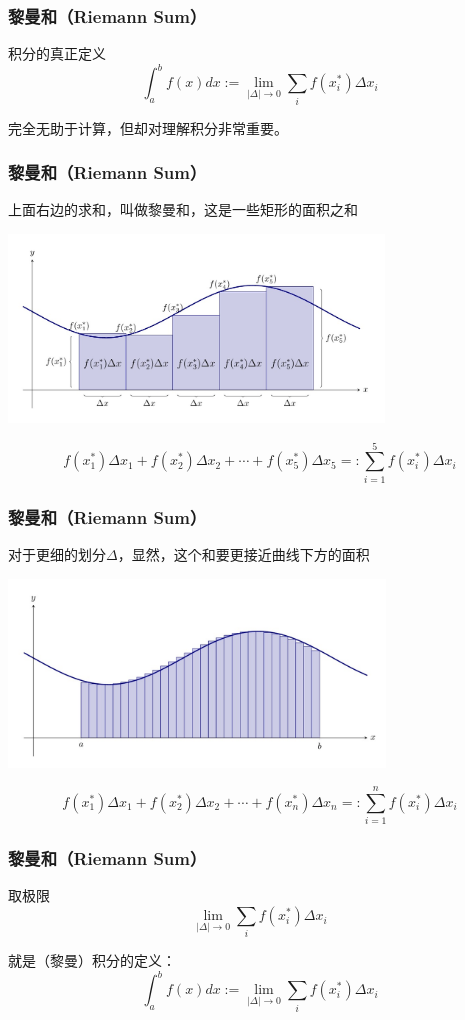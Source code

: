 \documentclass[CJK]{beamer}
\begin{document}
\begin{frame}
\frametitle{黎曼和（Riemann Sum）}
积分的真正定义
\[
	\int_a^b f(x)dx := \lim_{|\Delta|\to 0}\sum_i f(x_i^*)\Delta x_i
\]

完全\alert{无助于}计算，但却对\alert{理解}积分非常重要。
\end{frame}

\begin{frame}
\frametitle{黎曼和（Riemann Sum）}
上面右边的求和，叫做\alert{黎曼和}，这是一些矩形的面积之和
\begin{center}
\includegraphics[height=5cm]{graph9.jpeg}
\end{center}
\[
f(x_1^*)\Delta x_1 + f(x_2^*)\Delta x_2 + \cdots + f(x_5^*)\Delta x_5 =: \sum_{i=1}^5 f(x_i^*)\Delta x_i
\]
\end{frame}

\begin{frame}
\frametitle{黎曼和（Riemann Sum）}
对于更细的划分$\Delta$，显然，这个和要更接近曲线下方的面积
\begin{center}
\includegraphics[height=5cm]{graph10.jpeg}
\end{center}
\[
f(x_1^*)\Delta x_1 + f(x_2^*)\Delta x_2 + \cdots + f(x_n^*)\Delta x_n =: \sum_{i=1}^n f(x_i^*)\Delta x_i
\]
\end{frame}

\begin{frame}
\frametitle{黎曼和（Riemann Sum）}
取极限
\[
	\lim_{|\Delta|\to 0}\sum_i f(x_i^*)\Delta x_i
\]

就是（黎曼）积分的\alert{定义}：
\[
	\int_a^b f(x)dx := \lim_{|\Delta|\to 0}\sum_i f(x_i^*)\Delta x_i
\]
\end{frame}
\end{document}
